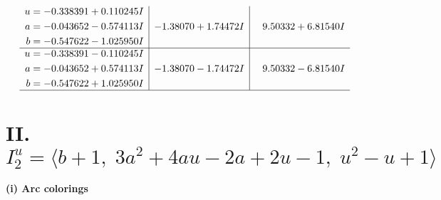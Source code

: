 \documentclass[1p]{elsarticle_modified}
\theoremstyle{definition}
\begin{document}
$$\begin{array}{c|c|c}
\begin{aligned}
u &= -0.338391 + 0.110245 I \\
a &= -0.043652 - 0.574113 I \\
b &= -0.547622 - 1.025950 I\end{aligned}
 & -1.38070 + 1.74472 I & \phantom{-}9.50332 + 6.81540 I \\ \hline\begin{aligned}
u &= -0.338391 - 0.110245 I \\
a &= -0.043652 + 0.574113 I \\
b &= -0.547622 + 1.025950 I\end{aligned}
 & -1.38070 - 1.74472 I & \phantom{-}9.50332 - 6.81540 I\\
 \hline 
 \end{array}$$\newpage\newpage\renewcommand{\arraystretch}{1}
\centering \section*{II. $I^u_{2}= \langle b+1,\;3 a^2+4 a u-2 a+2 u-1,\;u^2- u+1 \rangle$}
\flushleft \textbf{(i) Arc colorings}\\
\end{document}
